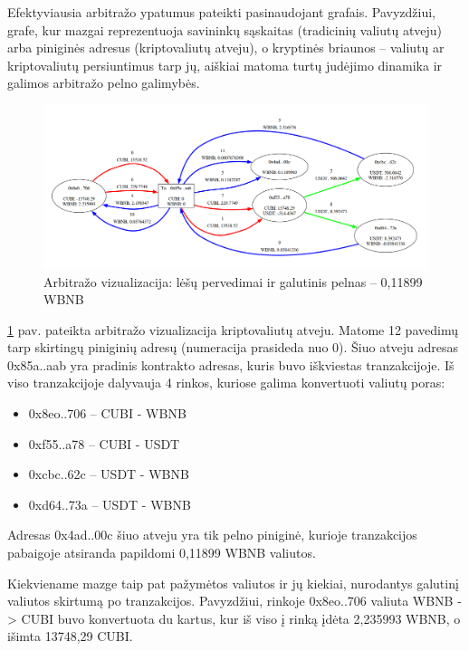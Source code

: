 \documentclass[]{VUMIFTemplateClass}
\begin{document}
Efektyviausia arbitražo ypatumus pateikti pasinaudojant grafais. Pavyzdžiui, grafe, kur mazgai reprezentuoja savininkų sąskaitas (tradicinių valiutų atveju) arba piniginės adresus (kriptovaliutų atveju), o kryptinės briaunos – valiutų ar kriptovaliutų persiuntimus tarp jų, aiškiai matoma turtų judėjimo dinamika ir galimos arbitražo pelno galimybės. 

\begin{figure}[H]
    \centering
    \includegraphics[scale=0.3]{img/arb1.png}
    \caption{Arbitražo vizualizacija: lėšų pervedimai ir galutinis pelnas – 0,11899 WBNB}
    \label{img:chess-minimax-2}
\end{figure} 

\ref{img:chess-minimax-2} pav. pateikta arbitražo vizualizacija kriptovaliutų atveju. Matome 12 pavedimų tarp skirtingų piniginių adresų (numeracija prasideda nuo 0). Šiuo atveju adresas 0x85a..aab yra pradinis kontrakto adresas, kuris buvo iškviestas tranzakcijoje. Iš viso tranzakcijoje dalyvauja 4 rinkos, kuriose galima konvertuoti valiutų poras:

\begin{itemize}
    \item 0x8eo..706 -- CUBI - WBNB
    \item 0xf55..a78 -- CUBI - USDT
    \item 0xcbc..62c -- USDT - WBNB
    \item 0xd64..73a -- USDT - WBNB
\end{itemize}

Adresas 0x4ad..00c šiuo atveju yra tik pelno piniginė, kurioje tranzakcijos pabaigoje atsiranda papildomi 0,11899 WBNB valiutos.

Kiekviename mazge taip pat pažymėtos valiutos ir jų kiekiai, nurodantys galutinį valiutos skirtumą po tranzakcijos. Pavyzdžiui, rinkoje 0x8eo..706 valiuta WBNB -> CUBI buvo konvertuota du kartus, kur iš viso į rinką įdėta 2,235993 WBNB, o išimta 13748,29 CUBI.
\end{document}

